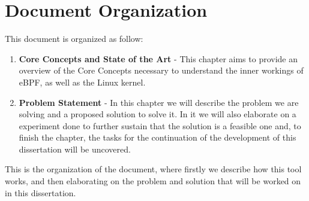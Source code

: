 \section{Document Organization}

This document is organized as follow:
\begin{enumerate}
    \item \textbf{Core Concepts and State of the Art} - This chapter aims to provide an overview of the Core Concepts necessary to understand the inner workings of eBPF, as well as the Linux kernel.
    \item \textbf{Problem Statement} - In this chapter we will describe the problem we are solving and a proposed solution to solve it. In it we will also elaborate on a experiment done to further sustain that the solution is a feasible one and, to finish the chapter, the tasks for the continuation of the development of this dissertation will be uncovered.
\end{enumerate}

This is the organization of the document, where firstly we describe how this tool works, and then elaborating on the problem and solution that will be worked on in this dissertation.
